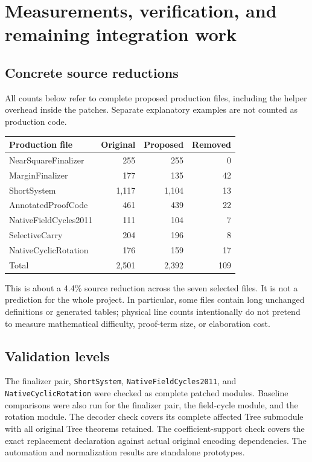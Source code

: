 \documentclass[11pt,letterpaper]{article}
\newcommand{\code}[1]{\nolinkurl{#1}}
\begin{document}
\section{Measurements, verification, and remaining integration work}

\subsection{Concrete source reductions}

All counts below refer to complete proposed production files, including the helper overhead inside the patches. Separate explanatory examples are not counted as production code.

\begin{center}
\begin{tabular}{@{}lrrr@{}}
\toprule
Production file & Original & Proposed & Removed\\\midrule
NearSquareFinalizer & 255 & 255 & 0\\
MarginFinalizer & 177 & 135 & 42\\
ShortSystem & 1,117 & 1,104 & 13\\
AnnotatedProofCode & 461 & 439 & 22\\
NativeFieldCycles2011 & 111 & 104 & 7\\
SelectiveCarry & 204 & 196 & 8\\
NativeCyclicRotation & 176 & 159 & 17\\\midrule
Total & 2,501 & 2,392 & 109\\
\bottomrule
\end{tabular}
\end{center}

This is about a 4.4\% source reduction across the seven selected files. It is not a prediction for the whole project. In particular, some files contain long unchanged definitions or generated tables; physical line counts intentionally do not pretend to measure mathematical difficulty, proof-term size, or elaboration cost.

\subsection{Validation levels}

The finalizer pair, \code{ShortSystem}, \code{NativeFieldCycles2011}, and \code{NativeCyclicRotation} were checked as complete patched modules. Baseline comparisons were also run for the finalizer pair, the field-cycle module, and the rotation module. The decoder check covers its complete affected Tree submodule with all original Tree theorems retained. The coefficient-support check covers the exact replacement declaration against actual original encoding dependencies. The automation and normalization results are standalone prototypes.
\end{document}
